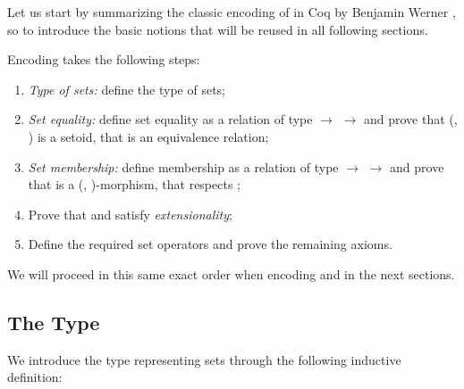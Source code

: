 
Let us start by summarizing the classic encoding of \ZF{} in Coq by Benjamin Werner \cite{DBLP:conf/tacs/Werner97}\footnotemark{}, so to introduce the basic notions that will be reused in all following sections.


\medskip

Encoding \ZF{} takes the following steps:
\begin{enumerate}
  \item \emph{Type of sets:} define the type \footnotemark{} of \ZF{} sets;
  \item \emph{Set equality:} define set equality as a relation  of type  $\to$  $\to$  and prove that (, ) is a setoid, \ie{} that  is an equivalence relation;
  \item \emph{Set membership:} define membership as a relation  of type  $\to$  $\to$  and prove that  is a (, )-morphism, \ie{} that  respects ;
  \item Prove that  and  satisfy \emph{extensionality};
  \item Define the required set operators and prove the remaining axioms.
\end{enumerate}

We will proceed in this same exact order when encoding \NFTWO{} and \NFO{} in the next sections.


\subsection{The Type \texorpdfstring{}{SET}}
We introduce the type representing \ZF{} sets through the following \Coq{} inductive definition:

